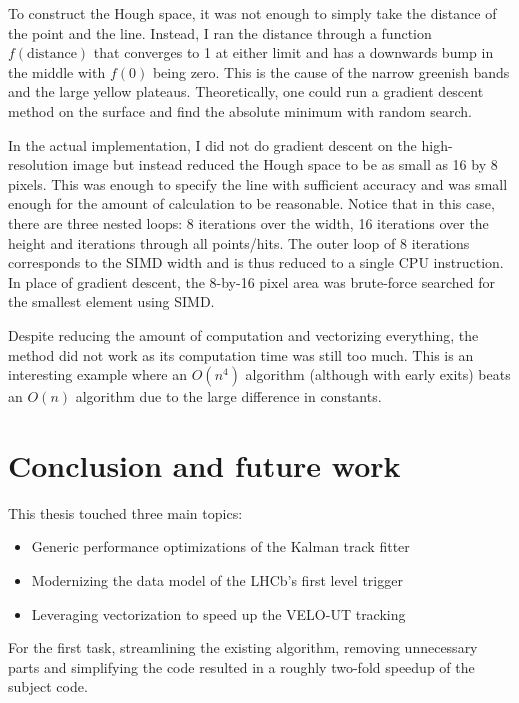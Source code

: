 \documentclass[12pt]{article}
\begin{document}
To construct the Hough space, it was not enough to simply take the distance of the point and the line. Instead, I ran the distance through a function $f(\text{distance})$ that converges to 1 at either limit and has a downwards bump in the middle with $f(0)$ being zero. This is the cause of the narrow greenish bands and the large yellow plateaus. Theoretically, one could run a gradient descent method on the surface and find the absolute minimum with random search.
\vspace{1pc}

In the actual implementation, I did not do gradient descent on the high-resolution image but instead reduced the Hough space to be as small as 16 by 8 pixels. This was enough to specify the line with sufficient accuracy and was small enough for the amount of calculation to be reasonable. Notice that in this case, there are three nested loops: 8 iterations over the width, 16 iterations over the height and iterations through all points/hits. The outer loop of 8 iterations corresponds to the SIMD width and is thus reduced to a single CPU instruction. In place of gradient descent, the 8-by-16 pixel area was brute-force searched for the smallest element using SIMD.
\vspace{1pc}

Despite reducing the amount of computation and vectorizing everything, the method did not work as its computation time was still too much. This is an interesting example where an $O(n^4)$ algorithm (although with early exits) beats an $O(n)$ algorithm due to the large difference in constants.


\newpage
\section{Conclusion and future work}

This thesis touched three main topics:
\begin{itemize}
	\item Generic performance optimizations of the Kalman track fitter
	\item Modernizing the data model of the LHCb's first level trigger
	\item Leveraging vectorization to speed up the VELO-UT tracking
\end{itemize}
For the first task, streamlining the existing algorithm, removing unnecessary parts and simplifying the code resulted in a roughly two-fold speedup of the subject code.
\end{document}
